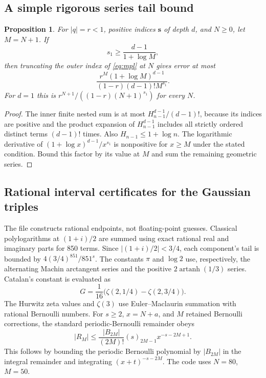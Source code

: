 \documentclass[11pt]{article}
\numberwithin{equation}{section}
\newtheorem{proposition}[theorem]{Proposition}
\theoremstyle{definition}\newtheorem{definition}[theorem]{Definition}
\theoremstyle{remark}\newtheorem{remark}[theorem]{Remark}
\newcommand{\code}[1]{\texttt{\detokenize{#1}}}
\begin{document}
\subsection{A simple rigorous series tail bound}
\begin{proposition}\label{prop:tail}
For $|q|=r<1$, positive indices $\boldsymbol s$ of depth $d$, and
$N\ge0$, let $M=N+1$. If
\[
 s_1\ge\frac{d-1}{1+\log M},
\]
then truncating the outer index of \eqref{eq:mpl} at $N$ gives error at
most
\begin{equation}\label{eq:tail}
 \frac{r^M(1+\log M)^{d-1}}
 {(1-r)(d-1)!M^{s_1}}.
\end{equation}
For $d=1$ this is $r^{N+1}/((1-r)(N+1)^{s_1})$ for every $N$.
\end{proposition}
\begin{proof}
The inner finite nested sum is at most
$H_{n-1}^{d-1}/(d-1)!$, because its indices are positive and the product
expansion of $H_{n-1}^{d-1}$ includes all strictly ordered distinct terms
$(d-1)!$ times. Also $H_{n-1}\le1+\log n$.
The logarithmic derivative of
$(1+\log x)^{d-1}/x^{s_1}$ is nonpositive for $x\ge M$ under the stated
condition. Bound this factor by its value at $M$ and sum the remaining
geometric series.
\end{proof}

\subsection{Rational interval certificates for the Gaussian triples}
The file \code{code/certify_gaussian.py} constructs rational endpoints,
not floating-point guesses. Classical polylogarithms at $(1+i)/2$ are
summed using exact rational real and imaginary parts for 850 terms.
Since $|(1+i)/2|<3/4$, each component's tail is bounded by
$4(3/4)^{851}/851^s$.
The constants $\pi$ and $\log2$ use, respectively, the alternating
Machin arctangent series and the positive $2\operatorname{artanh}(1/3)$
series. Catalan's constant is evaluated as
\[
 G=\frac1{16}\bigl(\zeta(2,1/4)-\zeta(2,3/4)\bigr).
\]
The Hurwitz zeta values and $\zeta(3)$ use Euler--Maclaurin summation
with rational Bernoulli numbers. For $s\ge2$, $x=N+a$, and $M$ retained
Bernoulli corrections, the standard periodic-Bernoulli remainder obeys
\begin{equation}\label{eq:EMbound}
 |R_M|\le
 \frac{|B_{2M}|}{(2M)!}(s)_{2M-1}x^{-s-2M+1}.
\end{equation}
This follows by bounding the periodic Bernoulli polynomial by
$|B_{2M}|$ in the integral remainder and integrating
$(x+t)^{-s-2M}$. The code uses $N=80$, $M=50$.
\end{document}
